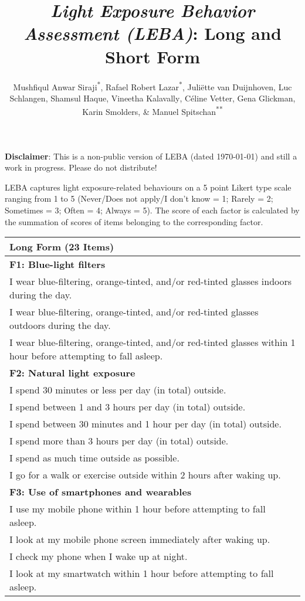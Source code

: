 \documentclass[
  english,
  man,floatsintext]{apa6}
\title{\emph{Light Exposure Behavior Assessment (LEBA)}: Long and Short Form}
\author{Mushfiqul Anwar Siraji\textsuperscript{*}, Rafael Robert Lazar\textsuperscript{*}, Juliëtte van Duijnhoven\textsuperscript{}, Luc Schlangen\textsuperscript{}, Shamsul Haque\textsuperscript{}, Vineetha Kalavally\textsuperscript{}, Céline Vetter\textsuperscript{}, Gena Glickman\textsuperscript{}, Karin Smolders\textsuperscript{}, \& Manuel Spitschan\textsuperscript{**}}
\date{}
\affiliation{\vspace{0.5cm}\textsuperscript{*} Joint first authors\\\textsuperscript{**} Corresponding author: \href{mailto:manuel.spitschan@psy.ox.ac.uk}{\nolinkurl{manuel.spitschan@psy.ox.ac.uk}}}
\begin{document}
\maketitle

\textbf{Disclaimer}: This is a non-public version of LEBA (dated \today) and still a work in progress. Please do not distribute!

LEBA captures light exposure-related behaviours on a 5 point Likert type scale ranging from 1 to 5 (Never/Does not apply/I don't know = 1; Rarely = 2; Sometimes = 3; Often = 4; Always = 5). The score of each factor is calculated by the summation of scores of items belonging to the corresponding factor.

\newpage

\begin{longtable}[]{@{}
  >{\raggedright\arraybackslash}p{}@{}}
\toprule
Long Form (23 Items) \\
\midrule
\endhead
\textbf{F1: Blue-light filters} \\
I wear blue-filtering, orange-tinted, and/or red-tinted glasses indoors during the day. \\
I wear blue-filtering, orange-tinted, and/or red-tinted glasses outdoors during the day. \\
I wear blue-filtering, orange-tinted, and/or red-tinted glasses within 1 hour before attempting to fall asleep. \\
\textbf{F2: Natural light exposure} \\
I spend 30 minutes or less per day (in total) outside. \\
I spend between 1 and 3 hours per day (in total) outside. \\
I spend between 30 minutes and 1 hour per day (in total) outside. \\
I spend more than 3 hours per day (in total) outside. \\
I spend as much time outside as possible. \\
I go for a walk or exercise outside within 2 hours after waking up. \\
\textbf{F3: Use of smartphones and wearables} \\
I use my mobile phone within 1 hour before attempting to fall asleep. \\
I look at my mobile phone screen immediately after waking up. \\
I check my phone when I wake up at night. \\
I look at my smartwatch within 1 hour before attempting to fall asleep. \\

\end{longtable}
\end{document}
